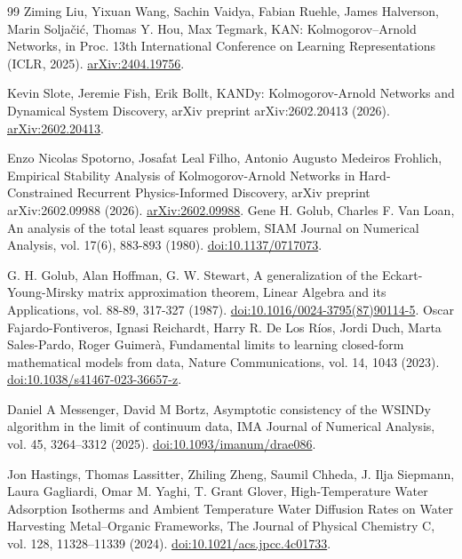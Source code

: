 \begin{thebibliography}{99}
 Ziming Liu, Yixuan Wang, Sachin Vaidya, Fabian Ruehle, James Halverson, Marin Solja\v{c}i\'c, Thomas Y. Hou, Max Tegmark, KAN: Kolmogorov--Arnold Networks, in Proc. 13th International Conference on Learning Representations (ICLR, 2025). \href{https://arxiv.org/abs/2404.19756}{arXiv:2404.19756}.

 Kevin Slote, Jeremie Fish, Erik Bollt, KANDy: Kolmogorov-Arnold Networks and Dynamical System Discovery, arXiv preprint arXiv:2602.20413 (2026). \href{https://arxiv.org/abs/2602.20413}{arXiv:2602.20413}.

 Enzo Nicolas Spotorno, Josafat Leal Filho, Antonio Augusto Medeiros Frohlich, Empirical Stability Analysis of Kolmogorov-Arnold Networks in Hard-Constrained Recurrent Physics-Informed Discovery, arXiv preprint arXiv:2602.09988 (2026). \href{https://arxiv.org/abs/2602.09988}{arXiv:2602.09988}.
 Gene H. Golub, Charles F. Van Loan, An analysis of the total least squares problem, SIAM Journal on Numerical Analysis, vol. 17(6), 883-893 (1980). \href{https://doi.org/10.1137/0717073}{doi:10.1137/0717073}.

 G. H. Golub, Alan Hoffman, G. W. Stewart, A generalization of the Eckart-Young-Mirsky matrix approximation theorem, Linear Algebra and its Applications, vol. 88-89, 317-327 (1987). \href{https://doi.org/10.1016/0024-3795(87)90114-5}{doi:10.1016/0024-3795(87)90114-5}.
 Oscar Fajardo-Fontiveros, Ignasi Reichardt, Harry R. De Los R\'{i}os, Jordi Duch, Marta Sales-Pardo, Roger Guimer\`{a}, Fundamental limits to learning closed-form mathematical models from data, Nature Communications, vol. 14, 1043 (2023). \href{https://doi.org/10.1038/s41467-023-36657-z}{doi:10.1038/s41467-023-36657-z}.

 Daniel A Messenger, David M Bortz, Asymptotic consistency of the WSINDy algorithm in the limit of continuum data, IMA Journal of Numerical Analysis, vol. 45, 3264--3312 (2025). \href{https://doi.org/10.1093/imanum/drae086}{doi:10.1093/imanum/drae086}.

 Jon Hastings, Thomas Lassitter, Zhiling Zheng, Saumil Chheda, J. Ilja Siepmann, Laura Gagliardi, Omar M. Yaghi, T. Grant Glover, High-Temperature Water Adsorption Isotherms and Ambient Temperature Water Diffusion Rates on Water Harvesting Metal--Organic Frameworks, The Journal of Physical Chemistry C, vol. 128, 11328--11339 (2024). \href{https://doi.org/10.1021/acs.jpcc.4c01733}{doi:10.1021/acs.jpcc.4c01733}.


\end{thebibliography}

